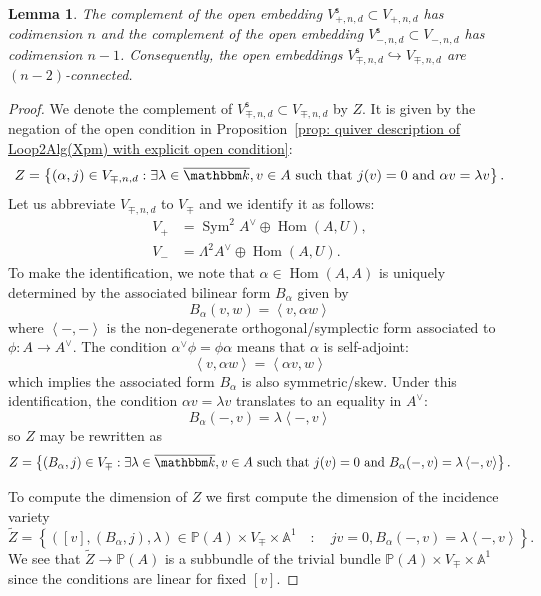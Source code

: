 \message{ !name(Bryan-Vakil.tex)}\documentclass{amsart}
\newtheorem{lemma}[theorem]{Lemma}
\theoremstyle{definition}
\newcommand{\kk} {{\mathbbm k}}
\renewcommand{\AA} {{\mathbb A}}
\newcommand{\PP}{\mathbb{P}}
\newcommand{\Hom}{\operatorname{Hom}}
\newcommand{\Sym}{\operatorname{Sym}}
\newcommand{\stable}{\mathsf{s}}
\begin{document}
\begin{lemma}\label{lem: the complement of Vstable in V in the Sp/O
case has codim n} The complement of the open embedding $V^{\stable}_{+
,n,d}\subset  V_{+ ,n,d}$ has codimension $n$ and the
complement of the open embedding $V^{\stable}_{- ,n,d}\subset 
V_{- ,n,d}$ has codimension $n-1$.
Consequently, the open embeddings  $V^{\stable}_{\mp  ,n,d}\hookrightarrow
V_{\mp  ,n,d}$ are $(n-2)$-connected. 
\end{lemma}
\begin{proof}
We denote the complement of $V^{\stable}_{\mp ,n,d}\subset V_{\mp
,n,d}$ by $Z$. It is given by the negation of the open condition in
Proposition~\ref{prop: quiver description of Loop2Alg(Xpm) with
explicit open condition}:
\[
Z=\left\{(\alpha ,j)\in V_{\mp ,n,d}: \exists \lambda \in \overline{\kk} ,v\in A\text{ such that
}j(v)=0\text{ and } \alpha v=\lambda v \right\}.
\]
Let us abbreviate $V_{\mp ,n,d}$ to $V_{\mp}$ and we 
identify it as follows:
\begin{align*}
V_{+}&=\Sym^{2}A^{\vee}\oplus \Hom (A,U),\\
V_{-}&=\Lambda ^{2}A^{\vee}\oplus \Hom (A,U).
\end{align*}
To make the identification, we note that $\alpha \in \Hom (A,A)$ is
uniquely determined by the associated bilinear form $B_{\alpha}$ given
by 
\[
B_{\alpha}(v,w) = \left\langle v,\alpha w \right\rangle
\]
where $\left\langle -,- \right\rangle$ is the non-degenerate
orthogonal/symplectic form associated to $\phi :A\to A^{\vee}$. The
condition $\alpha^{\vee } \phi =\phi \alpha$ means that $\alpha$ is
self-adjoint: 
\[
\left\langle v,\alpha w \right\rangle=\left\langle \alpha v,w \right\rangle
\]
which implies the associated form $B_{\alpha}$ is also
symmetric/skew. Under this identification, the condition $\alpha
v=\lambda v$ translates to an equality in $A^{\vee}$:
\[
B_{\alpha}(-,v) = \lambda \left\langle -,v \right\rangle
\]
so $Z$ may be rewritten as
\[
Z=\left\{(B_{\alpha } ,j)\in V_{\mp}: \exists \lambda \in \overline{\kk} ,v\in A\text{ such that
}j(v)=0\text{ and }  B_{\alpha}(-,v) = \lambda \left\langle -,v \right\rangle\right\}.
\]

To compute the dimension of $Z$ we first compute the dimension of the
incidence variety
\[
\tilde{Z} =\left\{([v],(B_{\alpha},j),\lambda )\in \PP (A)\times
V_{\mp}\times \AA^{1} \quad :\quad jv=0, B_{\alpha}(-,v) = \lambda
\left\langle -,v \right\rangle   \right\}.
\]
We see that $\tilde{Z}\to \PP (A)$ is a subbundle of the trivial
bundle $\PP (A)\times V_{\mp}\times \AA^{1}$ since the conditions are
linear for fixed $[v]$.


\end{proof}
\end{document}

